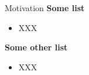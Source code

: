 \begin{frame}[c]{Motivation}    
    {\bf  Some list}
    \begin{itemize}
        \item  XXX
    \end{itemize}
    \vspace{1cm}
    {\bf Some other list}
    \begin{itemize}
        \item  XXX
    \end{itemize}
\end{frame}